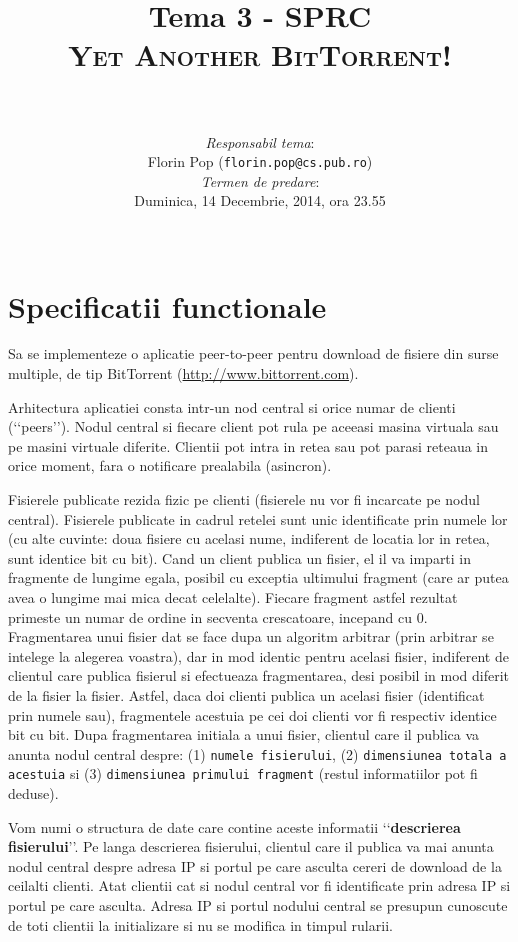 \documentclass[a4paper]{article}
\author{
\noindent\rule{10cm}{0.4pt}\vspace{0.1in}\\
\textit{Responsabil tema}:\\Florin Pop (\texttt{florin.pop@cs.pub.ro})
\vspace{0.15in}
\\\textit{Termen de predare}:\\Duminica, 14 Decembrie, 2014, ora 23.55
\vspace{0.15in}\\\noindent\rule{10cm}{0.4pt}
}
\title{Tema 3 - SPRC\\\textsc{Yet Another BitTorrent!}}
\date{}
\begin{document}
\maketitle

\section{Specificatii functionale}
\label{sec1}

\par Sa se implementeze o aplicatie peer-to-peer pentru download de fisiere din surse multiple, de tip BitTorrent (\url{http://www.bittorrent.com}).

\par Arhitectura aplicatiei consta intr-un nod central si orice numar de clienti (\lq\lq{}peers\rq\rq{}). Nodul central si fiecare client pot rula pe aceeasi masina virtuala sau pe masini virtuale diferite. Clientii pot intra in retea sau pot parasi reteaua in orice moment, fara o notificare prealabila (asincron).

\par Fisierele publicate rezida fizic pe clienti (fisierele nu vor fi incarcate pe nodul central). Fisierele publicate in cadrul retelei sunt unic identificate prin numele lor (cu alte cuvinte: doua fisiere cu acelasi nume, indiferent de locatia lor in retea, sunt identice bit cu bit). Cand un client publica un fisier, el il va imparti in fragmente de lungime egala, posibil cu exceptia ultimului fragment (care ar putea avea o lungime mai mica decat celelalte). Fiecare fragment astfel rezultat primeste un numar de ordine in secventa crescatoare, incepand cu 0. Fragmentarea unui fisier dat se face dupa un algoritm arbitrar (prin arbitrar se intelege la alegerea voastra), dar in mod identic pentru acelasi fisier, indiferent de clientul care publica fisierul si efectueaza fragmentarea, desi posibil in mod diferit de la fisier la fisier. Astfel, daca doi clienti publica un acelasi fisier (identificat prin numele sau), fragmentele acestuia pe cei doi clienti vor fi respectiv identice bit cu bit. Dupa fragmentarea initiala a unui fisier, clientul care il publica va anunta nodul central despre: (1) \texttt{numele fisierului}, (2) \texttt{dimensiunea totala a acestuia} si (3) \texttt{dimensiunea primului fragment} (restul informatiilor pot fi deduse).

\par Vom numi o structura de date care contine aceste informatii \lq\lq{}\textbf{descrierea fisierului}\rq\rq{}. Pe langa descrierea fisierului, clientul care il publica va mai anunta nodul central despre adresa IP si portul pe care asculta cereri de download de la ceilalti clienti. Atat clientii cat si nodul central vor fi identificate prin adresa IP si portul pe care asculta. Adresa IP si portul nodului central se presupun cunoscute de toti clientii la initializare si nu se modifica in timpul rularii.
\end{document}
